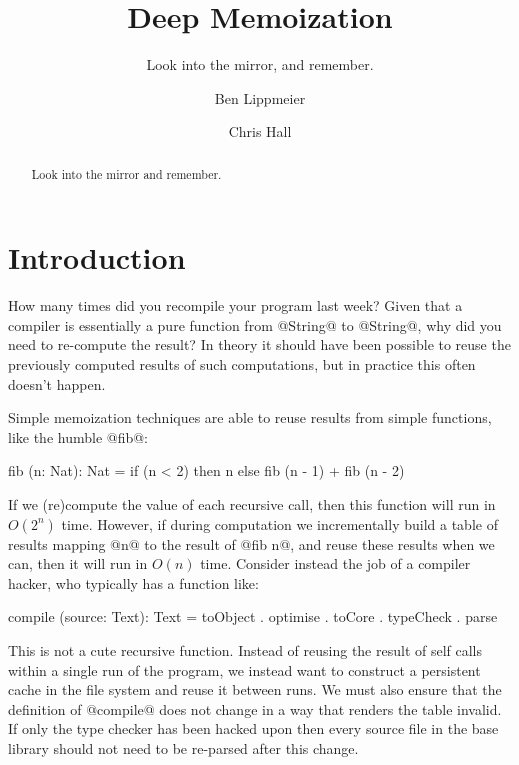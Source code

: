 \documentclass[acmsmall]{acmart}
\begin{document}
\title{Deep Memoization}
\subtitle{Look into the mirror, and remember.}

\author{Ben Lippmeier}
\author{Chris Hall}

\begin{abstract}
Look into the mirror and remember.
\end{abstract}

\maketitle
\makeatactive

\section{Introduction}
How many times did you recompile your program last week? Given that a compiler is essentially a pure function from @String@ to @String@, why did you need to re-compute the result? In theory it should have been possible to reuse the previously computed results of such computations, but in practice this often doesn't happen.

Simple memoization techniques are able to reuse results from simple functions, like the humble @fib@:
%
\begin{code}
  fib (n: Nat): Nat
   = if (n < 2) then n
                else fib (n - 1) + fib (n - 2)
\end{code}
%
If we (re)compute the value of each recursive call, then this function will run in $O(2^n)$ time. However, if during computation we incrementally build a table of results mapping @n@ to the result of @fib n@, and reuse these results when we can, then it will run in $O(n)$ time. Consider instead the job of a compiler hacker, who typically has a function like:
%
\begin{code}
 compile (source: Text): Text
  = toObject . optimise . toCore . typeCheck . parse
\end{code}
%
This is not a cute recursive function. Instead of reusing the result of self calls within a single run of the program, we instead want to construct a persistent cache in the file system and reuse it between runs. We must also ensure that the definition of @compile@ does not change in a way that renders the table invalid. If only the type checker has been hacked upon then every source file in the base library should not need to be re-parsed after this change.
\end{document}
